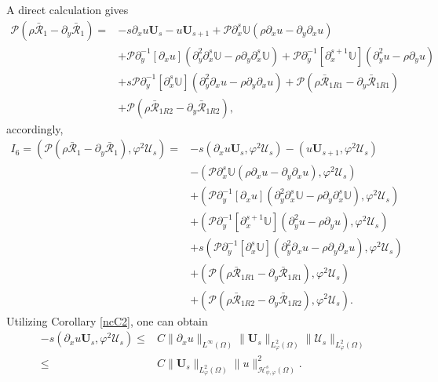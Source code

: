 \documentclass{amsart}
\numberwithin{equation}{section}
\begin{document}
A direct calculation gives
\begin{align*}
\mathcal{P}(\rho\bar{\mathcal{R}}_{1}-\partial_{y}\bar{\mathcal{R}}_{1})
=&-s\partial_{x}u\mathbf{U}_{s}
  -u\mathbf{U}_{s+1}
  +\mathcal{P}\partial_{x}^{s}\mathbb{U}(\rho\partial_{x}u-\partial_{y}\partial_{x}u)\\
 &+\mathcal{P}\partial_{y}^{-1}[\partial_{x}u](\partial_{y}^{2}\partial_{x}^{s}\mathbb{U}-\rho\partial_{y}\partial_{x}^{s}\mathbb{U})
  +\mathcal{P}\partial_{y}^{-1}[\partial_{x}^{s+1}\mathbb{U}](\partial_{y}^{2}u-\rho\partial_{y}u)\\
 &+s\mathcal{P}\partial_{y}^{-1}[\partial_{x}^{s}\mathbb{U}](\partial_{y}^{2}\partial_{x}u-\rho\partial_{y}\partial_{x}u)
  +\mathcal{P}(\rho\bar{\mathcal{R}}_{1R1}-\partial_{y}\bar{\mathcal{R}}_{1R1})\\
 &+\mathcal{P}(\rho\bar{\mathcal{R}}_{1R2}-\partial_{y}\bar{\mathcal{R}}_{1R2}),
\end{align*}
accordingly,
\begin{align}\label{I6}
I_{6}
=(\mathcal{P}(\rho\bar{\mathcal{R}}_{1}-\partial_{y}\bar{\mathcal{R}}_{1}),\varphi^{2}\mathcal{U}_{s})
=&-s(\partial_{x}u\mathbf{U}_{s},\varphi^{2}\mathcal{U}_{s})
  -(u\mathbf{U}_{s+1},\varphi^{2}\mathcal{U}_{s})\\
 &-(\mathcal{P}\partial_{x}^{s}\mathbb{U}(\rho\partial_{x}u-\partial_{y}\partial_{x}u),\varphi^{2}\mathcal{U}_{s})\nonumber\\
 &+(\mathcal{P}\partial_{y}^{-1}[\partial_{x}u](\partial_{y}^{2}\partial_{x}^{s}\mathbb{U}-\rho\partial_{y}\partial_{x}^{s}\mathbb{U}),\varphi^{2}\mathcal{U}_{s})\nonumber\\
 &+(\mathcal{P}\partial_{y}^{-1}[\partial_{x}^{s+1}\mathbb{U}](\partial_{y}^{2}u-\rho\partial_{y}u),\varphi^{2}\mathcal{U}_{s})\nonumber\\
 &+s(\mathcal{P}\partial_{y}^{-1}[\partial_{x}^{s}\mathbb{U}](\partial_{y}^{2}\partial_{x}u-\rho\partial_{y}\partial_{x}u),\varphi^{2}\mathcal{U}_{s})\nonumber\\
 &+(\mathcal{P}(\rho\bar{\mathcal{R}}_{1R1}-\partial_{y}\bar{\mathcal{R}}_{1R1}),\varphi^{2}\mathcal{U}_{s})\nonumber\\
 &+(\mathcal{P}(\rho\bar{\mathcal{R}}_{1R2}-\partial_{y}\bar{\mathcal{R}}_{1R2}),\varphi^{2}\mathcal{U}_{s}).\nonumber
\end{align}
Utilizing Corollary \ref{ncC2}, one can obtain
\begin{align}\label{I61}
-s(\partial_{x}u\mathbf{U}_{s},\varphi^{2}\mathcal{U}_{s})
\leq& C\|\partial_{x}u\|_{L^{\infty}(\Omega)}
      \|\mathbf{U}_{s}\|_{L_{\varphi}^{2}(\Omega)}
      \|\mathcal{U}_{s}\|_{L_{\varphi}^{2}(\Omega)}\\
\leq& C\|\mathbf{U}_{s}\|_{L_{\varphi}^{2}(\Omega)}
       \|u\|_{\mathcal{H}_{\psi,\varphi}^{s}(\Omega)}^{2}.\nonumber
\end{align}
\end{document}
